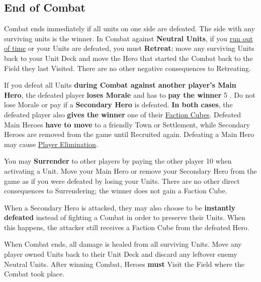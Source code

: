 \begin{multicols}{2}
\subsection*{\hypertarget{Endcombat}{End of Combat}}
Combat ends immediately if all units on one side are defeated.
The side with any surviving units is the winner.
In Combat against \textbf{Neutral Units}, if you \hyperlink{Timelimit}{run out of time} or your Units are defeated, you must \textbf{Retreat}; move any surviving Units back to your Unit Deck and move the Hero that started the Combat back to the Field they last Visited.
There are no other negative consequences to Retreating.\par
{}\par
If you defeat all Units \textbf{during Combat against another player's Main Hero}, the defeated player \textbf{loses Morale} and has to \textbf{pay the winner} 5 .
Do not lose Morale or pay  if a \textbf{Secondary Hero} is defeated.
\textbf{In both cases}, the defeated player also \textbf{gives the winner} one of their \hyperlink{End}{Faction Cubes}.
Defeated Main Heroes \textbf{have to move} to a friendly Town or Settlement, while Secondary Heroes are removed from the game until Recruited again.
Defeating a Main Hero may cause \hyperlink{End}{Player Elimination}.\par
You may \textbf{Surrender} to other players by paying the other player 10  when activating a Unit.
Move your Main Hero or remove your Secondary Hero from the game as if you were defeated by losing your Units.
There are no other direct consequences to Surrendering; the winner does not gain a Faction Cube.\par
{}\par
When a Secondary Hero is attacked, they may also choose to be \textbf{instantly defeated} instead of fighting a Combat in order to preserve their Units.
When this happens, the attacker still receives a Faction Cube from the defeated Hero.\par
When Combat ends, all damage is healed from all surviving Units.
Move any player owned Units back to their Unit Deck and discard any leftover enemy Neutral Units.
After winning Combat, Heroes \textbf{must} Visit the Field where the Combat took place.


\end{multicols}
